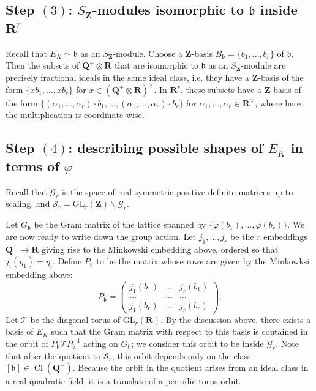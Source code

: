 \documentclass{amsart}
\newcommand{\QQ}{\mathbf{Q}}
\newcommand{\ZZ}{\mathbf{Z}}
\newcommand{\RR}{\mathbf{R}}
\newcommand{\gl}{\mathrm{GL}}
\DeclareMathOperator{\Cl}{Cl}
\numberwithin{equation}{section}
\begin{document}
\subsection{Step $(3)$: $S_{\ZZ}$-modules isomorphic to $\mathfrak{b}$ inside $\RR^r$}
Recall that $E_K \simeq \mathfrak{b}$ as an $S_{\ZZ}$-module. Choose a $\ZZ$-basis $B_{\mathfrak{b}} = \{b_1,\dots,b_r\}$ of $\mathfrak{b}$. Then the subsets of $\QQ^+ \otimes \RR$ that are isomorphic to $\mathfrak{b}$ as an $S_{\ZZ}$-module are precisely fractional ideals in the same ideal class, i.e. they have a $\ZZ$-basis of the form $\{ xb_1,\dots, xb_r\}$ for $x \in (\QQ^+ \otimes \RR)^{\times}$. In $\RR^{r}$, these subsets have a $\ZZ$-basis of the form $\{(\alpha_1,\dots,\alpha_r)\cdot b_1, \dots, (\alpha_1, \dots,\alpha_r)\cdot b_r\}$ for $\alpha_1,\dots,\alpha_r \in \RR^{\times}$, where here the multiplication is coordinate-wise. 

\subsection{Step $(4)$: describing possible shapes of $E_K$ in terms of $\varphi$}

Recall that $\mathcal{G}_r$ is the space of real symmetric positive definite matrices up to scaling, and $\mathcal{S}_r = \gl_r(\ZZ)\backslash \mathcal{G}_r$. 

Let $G_{\mathfrak{b}}$ be the Gram matrix of the lattice spanned by $\{\varphi(b_1),\dots,\varphi(b_r)\}$. We are now ready to write down the group action.
Let $j_1,\dots,j_r$ be the $r$ embeddings $\QQ^+ \rightarrow \RR$ giving rise to the Minkowski embedding above, ordered so that $j_i(\eta_1) = \eta_i$. Define $P_{\mathfrak{b}}$ to be the matrix whose rows are given by the Minkowksi embedding above:
 \[	P_{\mathfrak{b}} = 
		\begin{pmatrix}
				j_1(b_1)		& \dots &	j_r(b_1)	\\
                \dots	& \dots &	\dots	\\
				j_1(b_r)	&\dots &	j_r(b_r)
			\end{pmatrix}.
 	\]
Let $\mathcal{T}$ be the diagonal torus of $\gl_r(\RR)$. By the discussion above, there exists a basis of $E_K$ such that the Gram matrix with respect to this basis is contained in the orbit of $P_{\mathfrak{b}}\mathcal{T}P_{\mathfrak{b}}^{-1}$ acting on $G_{\mathfrak{b}}$; we consider this orbit to be inside $\mathcal{G}_r$. Note that after the quotient to $\mathcal{S}_r$, this orbit depends only on the class $[\mathfrak{b}] \in \Cl(\QQ^+)$. Because the orbit in the quotient arises from an ideal class in a real quadratic field, it is a translate of a periodic torus orbit. 
\end{document}
